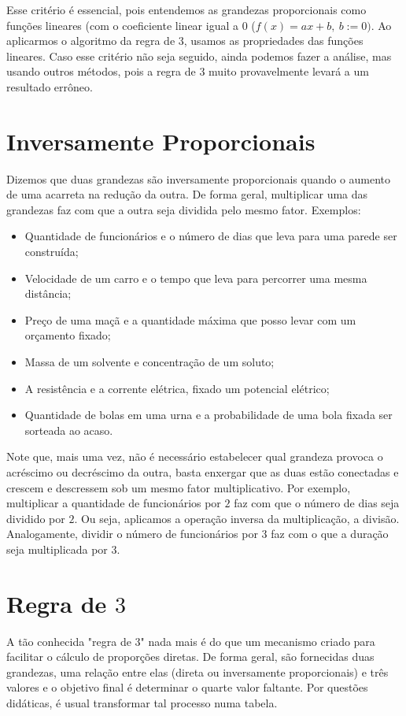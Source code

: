 \documentclass[12pt]{report}
\newcommand{\1}{\faThermometerEmpty}
\newcommand{\2}{\faThermometerQuarter}
\newcommand{\3}{\faThermometerHalf}
\newcommand{\4}{\faThermometerThreeQuarters}
\newcommand{\5}{\faThermometerFull}
\begin{document}
Esse critério é essencial, pois entendemos as grandezas proporcionais como funções lineares (com o coeficiente linear igual a $0$ ($f(x)=ax+b, \ b:=0)$. Ao aplicarmos o algoritmo da regra de $3$, usamos as propriedades das funções lineares. Caso esse critério não seja seguido, ainda podemos fazer a análise, mas usando outros métodos, pois a regra de $3$ muito provavelmente levará a um resultado errôneo.


\section*{Inversamente Proporcionais}
Dizemos que duas grandezas são inversamente proporcionais quando o aumento de uma acarreta na redução da outra. De forma geral, multiplicar uma das grandezas faz com que a outra seja dividida pelo mesmo fator. Exemplos:
\begin{itemize}
    \item Quantidade de funcionários e o número de dias que leva para uma parede ser construída;
    \item Velocidade de um carro e o tempo que leva para percorrer uma mesma distância;
    \item Preço de uma maçã e a quantidade máxima que posso levar com um orçamento fixado;
    \item Massa de um solvente e concentração de um soluto;
    \item A  resistência e a corrente elétrica, fixado um potencial elétrico;
    \item Quantidade de bolas em uma urna e a probabilidade de uma bola fixada ser sorteada ao acaso.
\end{itemize}

Note que, mais uma vez, não é necessário estabelecer qual grandeza provoca o acréscimo ou decréscimo da outra, basta enxergar que as duas estão conectadas e crescem e descressem sob um mesmo fator multiplicativo. Por exemplo, multiplicar a quantidade de funcionários por $2$ faz com que o número de dias seja dividido por $2$. Ou seja, aplicamos a operação inversa da multiplicação, a divisão. Analogamente, dividir o número de funcionários por $3$ faz com o que a duração seja multiplicada por $3$.

\section*{Regra de $3$}
A tão conhecida "regra de $3$" nada mais é do que um mecanismo criado para facilitar o cálculo de proporções diretas. De forma geral, são fornecidas duas grandezas, uma relação entre elas (direta ou inversamente proporcionais) e três valores e o objetivo final é determinar o quarte valor faltante. Por questões didáticas, é usual transformar tal processo numa tabela.
\end{document}
